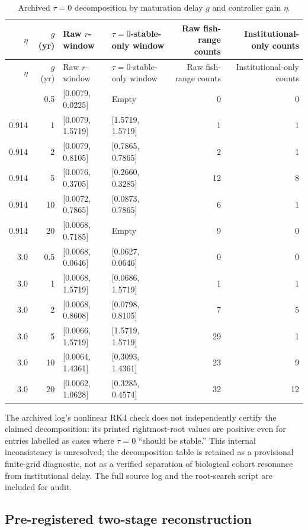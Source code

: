 \begin{landscape}\small
\begin{longtable}{@{}r r p{3.2cm}p{3.2cm}r r@{}}
\caption{Archived \(\tau=0\) decomposition by maturation delay \(g\) and controller gain \(\eta\).}\label{tab:tau0-decomp}\\
\toprule \(\eta\) & \(g\) (yr) & Raw \(r\)-window & \(\tau=0\)-stable-only window & Raw fish-range counts & Institutional-only counts \\
\midrule\endfirsthead
\toprule \(\eta\) & \(g\) (yr) & Raw \(r\)-window & \(\tau=0\)-stable-only window & Raw fish-range counts & Institutional-only counts \\
\midrule\endhead
\bottomrule\endfoot
0.914 & 0.5 & [0.0079, 0.0225] & Empty & 0 & 0 \\
0.914 & 1 & [0.0079, 1.5719] & [1.5719, 1.5719] & 1 & 1 \\
0.914 & 2 & [0.0079, 0.8105] & [0.7865, 0.7865] & 2 & 1 \\
0.914 & 5 & [0.0076, 0.3705] & [0.2660, 0.3285] & 12 & 8 \\
0.914 & 10 & [0.0072, 0.7865] & [0.0873, 0.7865] & 6 & 1 \\
0.914 & 20 & [0.0068, 0.7185] & Empty & 9 & 0 \\
3.0 & 0.5 & [0.0068, 0.0646] & [0.0627, 0.0646] & 0 & 0 \\
3.0 & 1 & [0.0068, 1.5719] & [0.0686, 1.5719] & 1 & 1 \\
3.0 & 2 & [0.0068, 0.8608] & [0.0798, 0.8105] & 7 & 5 \\
3.0 & 5 & [0.0066, 1.5719] & [1.5719, 1.5719] & 29 & 1 \\
3.0 & 10 & [0.0064, 1.4361] & [0.3093, 1.4361] & 23 & 9 \\
3.0 & 20 & [0.0062, 1.0628] & [0.3285, 0.4574] & 32 & 12 \\
\end{longtable}
\end{landscape}

The archived log's nonlinear RK4 check does not independently certify the claimed decomposition: its printed rightmost-root values are positive even for entries labelled as cases where \(\tau=0\) ``should be stable.'' This internal inconsistency is unresolved; the decomposition table is retained as a provisional finite-grid diagnostic, not as a verified separation of biological cohort resonance from institutional delay. The full source log and the root-search script are included for audit.

\subsection{Pre-registered two-stage reconstruction}

